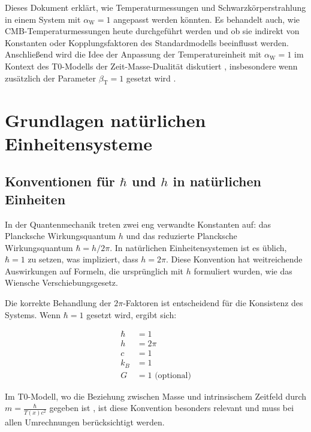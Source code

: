 \documentclass[12pt,a4paper]{article}
\newcommand{\Tfield}{T(x)}
\newcommand{\betaT}{\beta_{\text{T}}}
\newcommand{\alphaW}{\alpha_{\text{W}}}
\begin{document}
	Dieses Dokument erklärt, wie Temperaturmessungen und Schwarzkörperstrahlung in einem System mit \(\alphaW = 1\) angepasst werden könnten. Es behandelt auch, wie CMB-Temperaturmessungen heute durchgeführt werden und ob sie indirekt von Konstanten oder Kopplungsfaktoren des Standardmodells beeinflusst werden. Anschließend wird die Idee der Anpassung der Temperatureinheit mit \(\alphaW = 1\) im Kontext des T0-Modells der Zeit-Masse-Dualität diskutiert \cite{pascher_galaxies_2025}, insbesondere wenn zusätzlich der Parameter \(\betaT = 1\) gesetzt wird \cite{pascher_params_2025}.
	
	\section{Grundlagen natürlichen Einheitensysteme}
	
	\subsection{Konventionen für \(\hbar\) und \(h\) in natürlichen Einheiten}
	
	In der Quantenmechanik treten zwei eng verwandte Konstanten auf: das Plancksche Wirkungsquantum \(h\) und das reduzierte Plancksche Wirkungsquantum \(\hbar = h/2\pi\). In natürlichen Einheitensystemen ist es üblich, \(\hbar = 1\) zu setzen, was impliziert, dass \(h = 2\pi\). Diese Konvention hat weitreichende Auswirkungen auf Formeln, die ursprünglich mit \(h\) formuliert wurden, wie das Wiensche Verschiebungsgesetz.
	
	Die korrekte Behandlung der \(2\pi\)-Faktoren ist entscheidend für die Konsistenz des Systems. Wenn \(\hbar = 1\) gesetzt wird, ergibt sich:
	
	\begin{tcolorbox}[colback=blue!5!white,colframe=blue!75!black,title=Konventionen in natürlichen Einheiten]
		\begin{align}
			\hbar &= 1 \\
			h &= 2\pi \\
			c &= 1 \\
			k_B &= 1 \\
			G &= 1 \text{ (optional)}
		\end{align}
	\end{tcolorbox}
	
	Im T0-Modell, wo die Beziehung zwischen Masse und intrinsischem Zeitfeld durch \(m = \frac{\hbar}{\Tfield c^2}\) gegeben ist \cite{pascher_galaxies_2025}, ist diese Konvention besonders relevant und muss bei allen Umrechnungen berücksichtigt werden.
	
\end{document}
